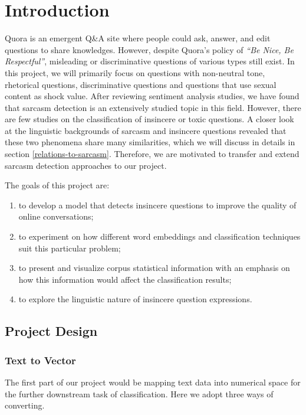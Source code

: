 \documentclass[12pt]{diazessay} %
\begin{document}
\section{Introduction}

Quora is an emergent Q\&A site where people could ask, answer, and edit questions to share knowledges. However, despite Quora's policy of \textit{``Be Nice, Be Respectful''}, misleading or discriminative questions of various types still exist. In this project, we will primarily focus on questions with non-neutral tone, rhetorical questions, discriminative questions and questions that use sexual content as shock value. After reviewing sentiment analysis studies, we have found that sarcasm detection is an extensively studied topic in this field. However, there are few studies on the classification of insincere or toxic questions. A closer look at the linguistic backgrounds of sarcasm and insincere questions revealed that these two phenomena share many similarities, which we will discuss in details in section \ref{relations-to-sarcasm}. Therefore, we are motivated to transfer and extend sarcasm detection approaches to our project. 

The goals of this project are: 
\begin{enumerate}
\item to develop a model that detects insincere questions to improve the quality of online conversations; 
\item to experiment on how different word embeddings and classification techniques suit this particular problem; 
\item to present and visualize corpus statistical information with an emphasis on how this information would affect the classification results; 
\item to explore the linguistic nature of insincere question expressions. 
\end{enumerate}

\subsection{Project Design}

\subsubsection{Text to Vector}

The first part of our project would be mapping text data into numerical space for the further downstream task of classification. Here we adopt three ways of converting.
\end{document}
